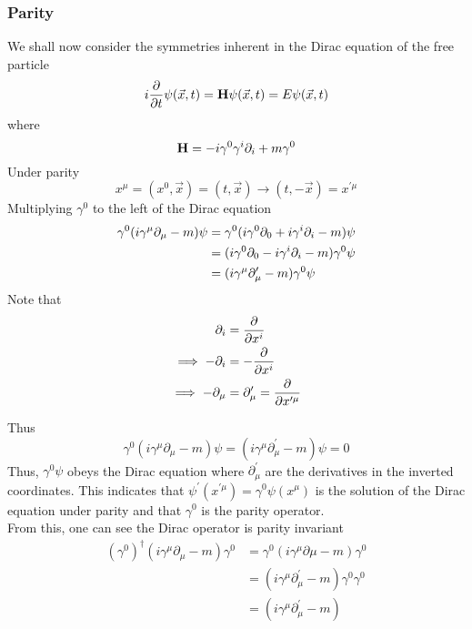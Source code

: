 \documentclass[12pt,a4paper,titlepage]{article}
\begin{document}
\subsubsection{Parity}
We shall now consider the symmetries inherent in the Dirac equation of the free particle
\begin{equation}
i\pdv{t}\psi(\vec{x},t)=\vb{H}\psi(\vec{x},t)=E\psi(\vec{x},t)
\end{equation}
where
\begin{equation}
\vb{H}=-i\gamma^{0}\gamma^{i}\partial_{i}+m\gamma^{0}
\end{equation}
Under parity
\begin{equation}
x^{\mu}=(x^{0},\vec{x})=(t,\vec{x})\rightarrow(t,-\vec{x})=x^{\prime\mu}
\end{equation}
Multiplying $\gamma^{0}$ to the left of the Dirac equation
\begin{equation}
\begin{aligned}
\gamma^{0}\qty(i\gamma^{\mu}\partial_{\mu}-m)\psi&=\gamma^{0}(i\gamma^{0}\partial_{0}+i\gamma^{i}\partial_{i}-m)\psi\\
&=(i\gamma^{0}\partial_{0}-i\gamma^{i}\partial_{i}-m)\gamma^{0}\psi\\
&=(i\gamma^{\mu}\partial_{\mu}^{\prime}-m)\gamma^{0}\psi
\end{aligned}
\end{equation}
Note that
\begin{equation}
\begin{aligned}
\partial_{i}&=\pdv{x^{i}}\\
\implies-\partial_{i}&=-\pdv{x^{i}}\\
\implies-\partial_{\mu}&=\partial_{\mu}^{\prime}=\pdv{x^{\prime\mu}}
\end{aligned}
\end{equation}

Thus
\begin{equation}
\gamma^{0}(i\gamma^{\mu}\partial_{\mu}-m)\psi=(i\gamma^{\mu}\partial_{\mu}^{\prime}-m)\psi=0
\end{equation}
Thus, $\gamma^{0}\psi$ obeys the Dirac equation where $\partial_{\mu}^{\prime}$ are the derivatives in the inverted coordinates. This indicates that $\psi^{\prime}(x^{\prime\mu})=\gamma^{0}\psi(x^{\mu})$ is the solution of the Dirac equation under parity and that $\gamma^{0}$ is the parity operator.\\

From this, one can see the Dirac operator is parity invariant
\begin{equation}
\begin{aligned}
(\gamma^{0})^{\dagger}(i\gamma^{\mu}\partial_{\mu}-m)\gamma^{0}&=\gamma^{0}(i\gamma^{\mu}\partial{\mu}-m)\gamma^{0}\\
&=(i\gamma^{\mu}\partial_{\mu}^{\prime}-m)\gamma^{0}\gamma^{0}\\
&=(i\gamma^{\mu}\partial_{\mu}^{\prime}-m)
\end{aligned}
\end{equation}
\end{document}
